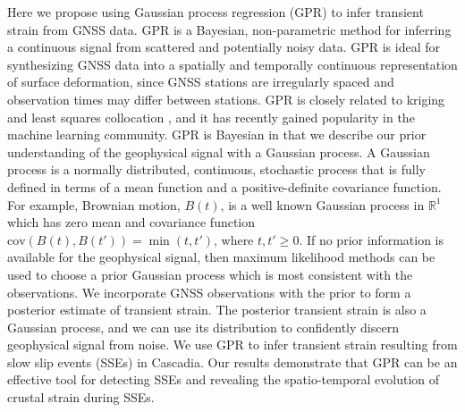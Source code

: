\documentclass[10pt,letter]{article}
\begin{document}
Here we propose using Gaussian process regression (GPR) \citep{Rasmussen2006} to infer transient strain from GNSS data. GPR is a Bayesian, non-parametric method for inferring a continuous signal from scattered and potentially noisy data. GPR is ideal for synthesizing GNSS data into a spatially and temporally continuous representation of surface deformation, since GNSS stations are irregularly spaced and observation times may differ between stations. GPR is closely related to kriging \citep{Cressie1992} and least squares collocation \citep{Kato1998}, and it has recently gained popularity in the machine learning community. GPR is Bayesian in that we describe our prior understanding of the geophysical signal with a Gaussian process. A Gaussian process is a normally distributed, continuous, stochastic process that is fully defined in terms of a mean function and a positive-definite covariance function. For example, Brownian motion, $B(t)$, is a well known Gaussian process in $\mathbb{R}^1$ which has zero mean and covariance function $\mathrm{cov}(B(t),B(t')) = \min(t,t')$, where $t,t' \ge 0$. If no prior information is available for the geophysical signal, then maximum likelihood methods can be used to choose a prior Gaussian process which is most consistent with the observations.  We incorporate GNSS observations with the prior to form a posterior estimate of transient strain.  The posterior transient strain is also a Gaussian process, and we can use its distribution to confidently discern geophysical signal from noise. We use GPR to infer transient strain resulting from slow slip events (SSEs) in Cascadia. Our results demonstrate that GPR can be an effective tool for detecting SSEs and revealing the spatio-temporal evolution of crustal strain during SSEs. 
\end{document}
